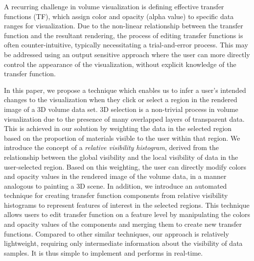 \documentclass[twoside,twocolumn,10pt]{article}
\begin{document}
A recurring challenge in volume visualization is defining effective transfer functions (TF), which assign color and opacity (alpha value) to specific data ranges for visualization. Due to the non-linear relationship between the transfer function and the resultant rendering, the process of editing transfer functions is often counter-intuitive, typically necessitating a trial-and-error process. This may be addressed using an output sensitive approach where the user can more directly control the appearance of the visualization, without explicit knowledge of the transfer function. 

In this paper, we propose a technique which enables us to infer a user's intended changes to the visualization when they click or select a region in the rendered image of a 3D volume data set. 3D selection is a non-trivial process in volume visualization due to the presence of many overlapped layers of transparent data. This is achieved in our solution by weighting the data in the selected region based on the proportion of materials visible to the user within that region. We introduce the concept of a \emph{relative visibility histogram}, derived from the relationship between the global visibility and the local visibility of data in the user-selected region.
Based on this weighting, the user can directly modify colors and opacity values in the rendered image of the volume data, in a manner analogous to painting a 3D scene.
In addition, we introduce an automated technique for creating transfer function components from relative visibility histograms to represent features of interest in the selected regions.
This technique allows users to edit transfer function on a feature level by manipulating the colors and opacity values of the components and merging them to create new transfer functions.
Compared to other similar techniques, our approach is relatively lightweight, requiring only intermediate information about the visibility of data samples. It is thus simple to implement and performs in real-time.


\end{document}
